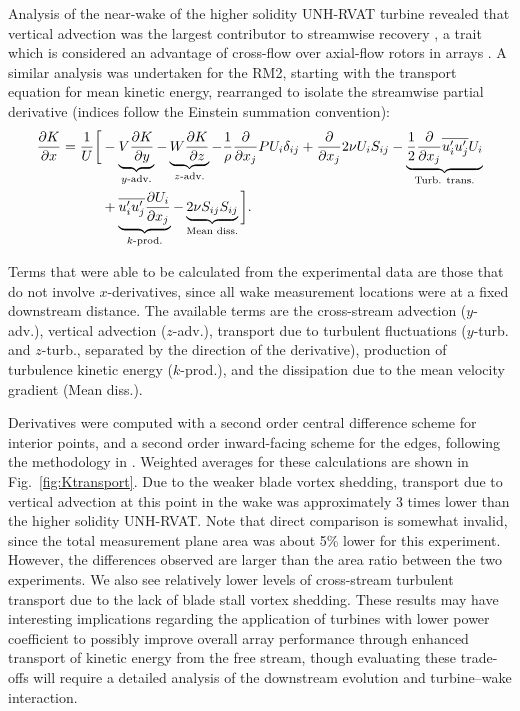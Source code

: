 \documentclass[10pt,letterpaper]{article}
\def \p{\partial}
\begin{document}
Analysis of the near-wake of the higher solidity UNH-RVAT turbine revealed that
vertical advection was the largest contributor to streamwise recovery
\cite{Bachant2015-JoT}, a trait which is considered an advantage of cross-flow
over axial-flow rotors in arrays \cite{Kinzel2012}. A similar analysis was
undertaken for the RM2, starting with the transport equation for mean kinetic
energy, rearranged to isolate the streamwise partial derivative (indices follow
the Einstein summation convention):
\begin{equation}
    \begin{split}
        \frac{\p K}{\p x}
        =
        \frac{1}{U}
        \bigg{[}
        & - \underbrace{V \frac{\p K}{\p y}}_{y\text{-adv.}}
        - \underbrace{W \frac{\p K}{\p z}}_{z\text{-adv.}}
        - \frac{1}{\rho}\frac{\p}{\p x_j} P U_i \delta_{ij}
        + \frac{\p}{\p x_j} 2 \nu U_i S_{ij}
        - \underbrace{
            \frac{1}{2}\frac{\p}{\p x_j} \overline{u_i' u_j'} U_i
        }_{\text{Turb. trans.}} \\
        & +
        \underbrace{
            \overline{u_i' u_j'} \frac{\p U_i}{\p x_j}
        }_{k\text{-prod.}}
        -
        \underbrace{
            2 \nu S_{ij}S_{ij}
        }_{\text{Mean diss.}}
        \bigg{]}.
    \end{split}
    \label{eq:K-full}
\end{equation}

Terms that were able to be calculated from the experimental data are those that
do not involve $x$-derivatives, since all wake measurement locations were at a
fixed downstream distance. The available terms are the cross-stream advection
($y$-adv.), vertical advection ($z$-adv.), transport due to turbulent
fluctuations ($y$-turb. and $z$-turb., separated by the direction of the
derivative), production of turbulence kinetic energy ($k$-prod.), and the
dissipation due to the mean velocity gradient (Mean diss.).

Derivatives were computed with a second order central difference scheme for
interior points, and a second order inward-facing scheme for the edges,
following the methodology in \cite{Bachant2015-JoT}. Weighted averages for these
calculations are shown in Fig.~\ref{fig:Ktransport}. Due to the weaker blade
vortex shedding, transport due to vertical advection at this point in the wake
was approximately 3 times lower than the higher solidity UNH-RVAT. Note that
direct comparison is somewhat invalid, since the total measurement plane area
was about 5\% lower for this experiment. However, the differences observed are
larger than the area ratio between the two experiments. We also see relatively
lower levels of cross-stream turbulent transport due to the lack of blade stall
vortex shedding. These results may have interesting implications regarding the
application of turbines with lower power coefficient to possibly improve overall
array performance through enhanced transport of kinetic energy from the free
stream, though evaluating these trade-offs will require a detailed analysis of
the downstream evolution and turbine--wake interaction.
\end{document}
